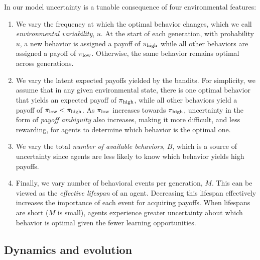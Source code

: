 \documentclass[letterpaper,11.5pt]{scrartcl}
\begin{document}
In our model uncertainty is a tunable consequence of four environmental features:
\begin{enumerate}
    \item We vary the frequency at which the optimal behavior changes, which we call \emph{environmental variability}, $u$. At the start of each generation, with probability $u$, a new behavior is assigned a payoff of $\pi_{\mathrm{high}}$ while all other behaviors are assigned a payoff of $\pi_{\mathrm{low}}$. Otherwise, the same behavior remains optimal across generations. 
    \item We vary the latent expected payoffs yielded by the bandits. For simplicity,
      we assume that in any given environmental state, there is one optimal behavior that
      yields an expected payoff of $\pi_{\mathrm{high}}$, while all other behaviors yield a 
      payoff of $\pi_{\mathrm{low}} < \pi_{\mathrm{high}}$. As $\pi_{\mathrm{low}}$ increases towards 
      $\pi_{\mathrm{high}}$, uncertainty in the form of \emph{payoff ambiguity} also increases,
      making it more difficult, and less rewarding, for agents to determine which
      behavior is the optimal one.
    \item We vary the total \emph{number of available behaviors}, $B$, which is a
      source of uncertainty since agents are less likely to know which behavior yields high payoffs.  
    \item Finally, we vary number of behavioral events per generation, $M$. This can be viewed as the \emph{effective lifespan} of an agent.  Decreasing this lifespan effectively increases the importance of each event for acquiring payoffs. When lifespans are short ($M$ is small), agents experience greater uncertainty about which behavior is optimal given the fewer learning opportunities.
\end{enumerate}


\subsection{Dynamics and evolution}
\end{document}
